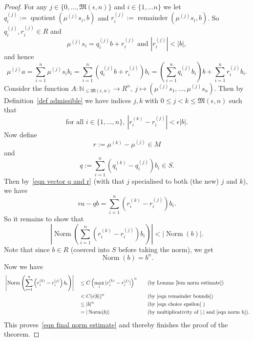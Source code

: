 \documentclass{amsart}
\newcommand{\N}{\mathbb{N}}
\newcommand{\M}{\mathfrak{M}}
\newcommand{\NN}{\operatorname{Norm}}
\newcommand{\remainder}{\operatorname{remainder}}
\newcommand{\quotient}{\operatorname{quotient}}
\begin{document}
\begin{proof}
For any $j \in \{0,\ldots,\M(\epsilon,n)\}$ and $i \in \{1,\ldots n\}$ we let $q^{(j)}_i:=\quotient(\mu^{(j)} s_i,b)$ and $r^{(j)}_i:=\remainder(\mu^{(j)} s_i,b)$. So $q^{(j)}_i,r^{(j)}_i \in R$ and
\[\mu^{(j)} s_i =q^{(j)}_i b+r^{(j)}_i \text{ and } |r^{(j)}_i|<|b|,\]
and hence
\begin{equation}\label{eqn vector q and r}
\mu^{(j)} a=\sum_{i=1}^n \mu^{(j)} s_i b_i= \sum_{i=1}^n (q^{(j)}_i b+r^{(j)}_i)b_i=\left( \sum_{i=1}^n q^{(j)}_i b_i\right)b+\sum_{i=1}^n r^{(j)}_i b_i.
\end{equation}
Consider the function $A : \N_{\leq \M(\epsilon,n)} \to R^n,\ j \mapsto (\mu^{(j)} s_1,\ldots,\mu^{(j)} s_n)$. Then by Definition~\ref{def admissible} we have indices $j,k$ with $0\leq j<k\leq \M(\epsilon,n)$ such that 
\begin{equation}\label{eqn remainder bounds}
\text{for all } i \in\{1,\ldots,n\},\ |r^{(k)}_i - r^{(j)}_i| < \epsilon |b|.
\end{equation}
Now define
\[r:=\mu^{(k)}-\mu^{(j)} \in M\]
and
\[q:=\sum_{i=1}^n (q^{(k)}_i-q^{(j)}_i) b_i \in S.\]
Then by~\eqref{eqn vector q and r} (with that $j$ specialised to both (the new) $j$ and $k$), we have
\[ra-qb=\sum_{i=1}^n \left(r^{(k)}_i - r^{(j)}_i\right) b_i.\]
So it remains to show that
\begin{equation}\label{eqn final norm estimate}
\left|\NN \left(\sum_{i=1}^n \left(r^{(k)}_i - r^{(j)}_i\right) b_i\right)\right| < |\NN(b)|.
\end{equation}
Note that since $b \in R$ (coerced into $S$ before taking the norm), we get
\begin{equation}\label{eqn norm b}
\NN(b)=b^n.
\end{equation}
Now we have
\begin{alignat*}{3}
& \left|\NN \left(\sum_{i=1}^n \left(r^{(k)}_i - r^{(j)}_i\right) b_i\right)\right|  && \leq C\left( \max_i |r^{(k)}_i - r^{(j)}_i| \right)^n  && \quad \text{(by Lemma~\ref{lem norm estimate})}\\
& && < C (\epsilon |b|)^n&& \quad \text{(by~\eqref{eqn remainder bounds})}\\
& && \leq |b|^n&& \quad \text{(by~\eqref{eqn choice epsilon} )}\\
& && =|\NN(b)| && \quad \text{(by multiplicativity of $|.|$ and~\eqref{eqn norm b})}.
\end{alignat*}
This proves~\eqref{eqn final norm estimate} and thereby finishes the proof of the theorem.
\end{proof}
\end{document}
